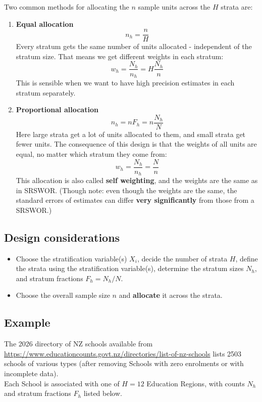 \documentclass[
]{book}
\providecommand{\tightlist}{%
  \setlength{\itemsep}{0pt}\setlength{\parskip}{0pt}}
\begin{document}
Two common methods for allocating the \(n\) sample units across the \(H\) strata are:

\begin{enumerate}
\def\labelenumi{\arabic{enumi}.}
\item
  \textbf{Equal allocation}
  \[
     n_h = \frac{n}{H}
  \]
  Every stratum gets the same number of units allocated - independent of
  the stratum size. That means we get different weights in each stratum:
  \[
     w_h = \frac{N_h}{n_h} = H\frac{N_h}{n}
  \]
  This is sensible when we want to have high precision estimates in
  each stratum separately.
\item
  \textbf{Proportional allocation}
  \[
     n_h = nF_h = n\frac{N_h}{N}
  \]
  Here large strata get a lot of units allocated to them, and small strata
  get fewer units. The consequence of this design is that the weights
  of all units are equal, no matter which stratum they come from:
  \[
     w_h = \frac{N_h}{n_h} = \frac{N}{n}
  \]
  This allocation is also called \textbf{self weighting}, and the weights
  are the same as in SRSWOR. (Though note: even though the weights are the
  same, the standard errors of estimates
  can differ \textbf{very significantly} from those from a SRSWOR.)
\end{enumerate}

\subsection*{Design considerations}\label{design-considerations-5}

\begin{itemize}
\tightlist
\item
  Choose the stratification variable(s) \(X_i\), decide the number of strata \(H\),
  define the strata using the stratification variable(s),
  determine the stratum sizes \(N_h\), and stratum fractions \(F_h=N_h/N\).
\item
  Choose the overall sample size \(n\) and \textbf{allocate} it across the strata.
\end{itemize}

\subsection*{Example}\label{example-5}

The 2026 directory of NZ schools available from \url{https://www.educationcounts.govt.nz/directories/list-of-nz-schools}
lists 2503 schools of various types (after removing Schools with zero enrolments or with incomplete data).\\
Each School is associated with one of \(H=12\) Education Regions, with counts \(N_h\) and stratum fractions \(F_h\)
listed below.
\end{document}
